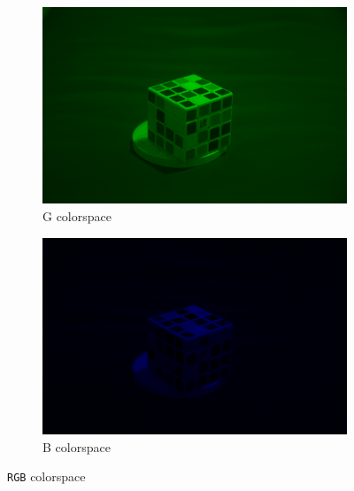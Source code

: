 \documentclass{article}
\begin{document}
\begin{figure}[h]
\begin{subfigure}[b]{0.4\textwidth}
\begin{center}
\end{center}
\end{subfigure}
\begin{subfigure}[b]{0.4\textwidth}
\begin{center}
	\includegraphics[width=\textwidth]{./implementation/experiment/green.png}
\end{center}
\caption{G colorspace}
\end{subfigure}
\begin{subfigure}[b]{0.4\textwidth}
\begin{center}
	\includegraphics[width=\textwidth]{./implementation/experiment/blue.png}
\end{center}
\caption{B colorspace}
\end{subfigure}
\caption{\texttt{RGB} colorspace}
\label{fig:rgb}
\end{figure}
\end{document}
